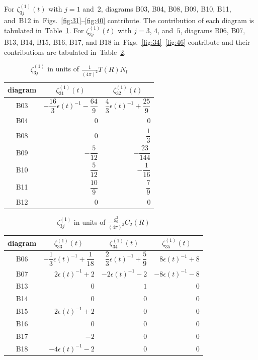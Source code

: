 For $\zeta_{3j}^{(1)}(t)$ with $j=1$ and~$2$, diagrams B03, B04, B08, B09, B10,
B11, and~B12 in~Figs.~\ref{fig:31}--\ref{fig:40} contribute. The contribution
of each diagram is tabulated in~Table~\ref{table:2}. For $\zeta_{3j}^{(1)}(t)$
with $j=3$, $4$, and~$5$, diagrams B06, B07, B13, B14, B15, B16, B17, and B18
in~Figs.~\ref{fig:34}--\ref{fig:46} contribute and their contributions are
tabulated in~Table~\ref{table:3}.
%
\begin{table}
\caption{$\zeta_{3j}^{(1)}$ in units of $\frac{1}{(4\pi)^2}T(R)N_{\mathrm{f}}$}
\label{table:2}
\begin{center}
\renewcommand{\arraystretch}{2.2}
\setlength{\tabcolsep}{20pt}
\begin{tabular}{crr}
\toprule
 diagram & \multicolumn{1}{c}{$\zeta_{31}^{(1)}(t)$}
 & \multicolumn{1}{c}{$\zeta_{32}^{(1)}(t)$} \\
\midrule
B03  & $-\dfrac{16}{3}\epsilon(t)^{-1}-\dfrac{64}{9}$ & $\dfrac{4}{3}\epsilon(t)^{-1}+\dfrac{25}{9}$ \\
B04  & $0$ & $0$ \\
B08  & $0$ & $-\dfrac{1}{3}$ \\
B09  & $-\dfrac{5}{12}$ & $-\dfrac{23}{144}$ \\
B10  & $\dfrac{5}{12}$ & $-\dfrac{1}{16}$ \\
B11  & $\dfrac{10}{9}$ & $\dfrac{7}{9}$ \\
B12  & $0$ & $0$ \\
\bottomrule
\end{tabular}
\end{center}
\end{table}
%
\begin{table}
\caption{$\zeta_{3j}^{(1)}$ in units of $\frac{g_0^2}{(4\pi)^2}C_2(R)$}
\label{table:3}
\begin{center}
\renewcommand{\arraystretch}{2.2}
\setlength{\tabcolsep}{20pt}
\begin{tabular}{crrr}
\toprule
 diagram & \multicolumn{1}{c}{$\zeta_{33}^{(1)}(t)$}
 & \multicolumn{1}{c}{$\zeta_{34}^{(1)}(t)$}
 & \multicolumn{1}{c}{$\zeta_{35}^{(1)}(t)$} \\
\midrule
 B06 & $-\dfrac{1}{3}\epsilon(t)^{-1}+\dfrac{1}{18}$ & $\dfrac{2}{3}\epsilon(t)^{-1}+\dfrac{5}{9}$ & $8\epsilon(t)^{-1}+8$ \\
 B07 & $2\epsilon(t)^{-1}+2$ & $-2\epsilon(t)^{-1}-2$ & $-8\epsilon(t)^{-1}-8$ \\
 B13 & $0$ & $1$ & $0$ \\
 B14 & $0$ & $0$ & $0$ \\
 B15 & $2\epsilon(t)^{-1}+2$ & $0$ & $0$ \\
 B16 & $0$ & $0$ & $0$ \\
 B17 & $-2$ & $0$ & $0$ \\
 B18 & $-4\epsilon(t)^{-1}-2$ & $0$ & $0$ \\
\bottomrule
\end{tabular}
\end{center}
\end{table}
